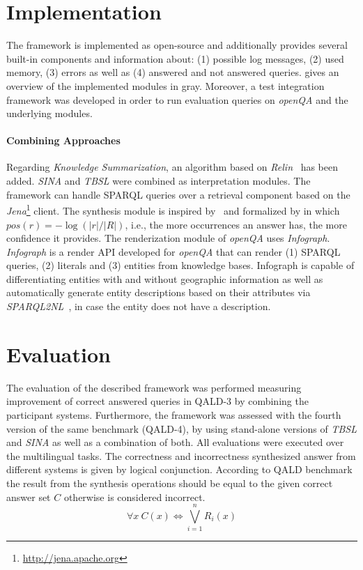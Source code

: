 \documentclass{acm_proc_article-sp}
\begin{document}
\section{Implementation}
\label{sec:impl}

The framework is implemented as open-source and additionally provides several built-in components and information about: (1) possible log messages, (2) used memory, (3) errors as well as (4) answered and not answered queries.
 gives an overview of the implemented modules in gray.
Moreover, a test integration framework was developed in order to run evaluation queries on \emph{openQA} and the underlying modules.

\paragraph{\textbf{Combining Approaches}}
\vspace{-4.0mm}
Regarding \emph{Knowledge Summarization}, an algorithm based on \emph{Relin}~\cite{cheng2011relin} has been added.
\emph{SINA} and \emph{TBSL} were combined as interpretation modules.
The framework can handle SPARQL queries over a retrieval component based on the \emph{Jena}\footnote{\url{http://jena.apache.org}} client.
The synthesis module is inspired by~\cite{conf/aswc/LopezNFSUM09} and formalized by  in which $pos(r) = - \log(|r|/|R|)$, i.e., the more occurrences an answer has, the more confidence it provides.
The renderization module of \emph{openQA} uses \emph{Infograph}.
\emph{Infograph} is a render API developed for \emph{openQA} that can render (1) SPARQL queries, (2) literals and (3) entities from knowledge bases.
Infograph is capable of differentiating entities with and without geographic information as well as automatically generate entity descriptions based on their attributes via \emph{SPARQL2NL}~\cite{sparql2nl-demo}, in case the entity does not have a description.

\section{Evaluation}
\label{sec:eval}

The evaluation of the described framework was performed measuring improvement of correct answered queries in QALD-3 by combining the participant systems.
Furthermore, the framework was assessed with the fourth version of the same benchmark (QALD-4), by using stand-alone versions of \emph{TBSL} and \emph{SINA} as well as a combination of both.
All evaluations were executed over the multilingual tasks.
The correctness and incorrectness synthesized answer from different systems is given by logical conjunction.
According to QALD benchmark the result from the synthesis operations should be equal to the given correct answer set $C$ otherwise is considered incorrect.
\[\forall x \ C(x) \iff \bigvee_{i=1}^n R_i(x)\]
\end{document}
